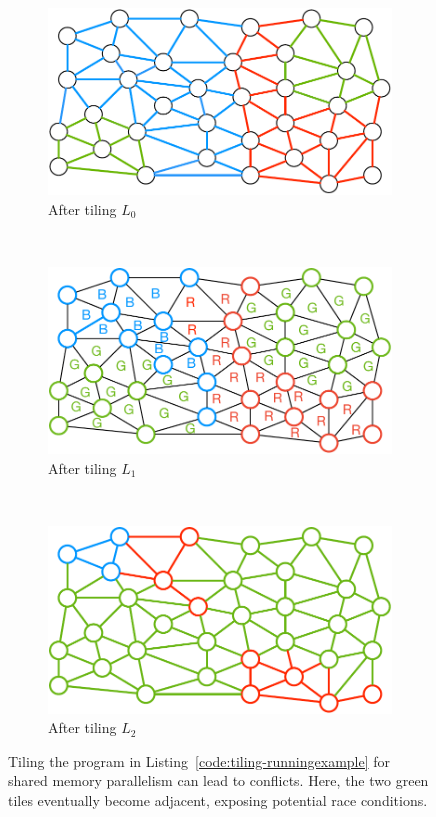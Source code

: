\begin{figure}[h]
\centering
\begin{subfigure}[b]{0.33\textwidth}
\includegraphics[width=\textwidth]{sparsetiling/figures/loop_0_conflicts.pdf}
\caption{After tiling $L_0$}
\label{fig:st-conflicts-a}
\end{subfigure}%
~ 
\begin{subfigure}[b]{0.33\textwidth}
\centering
\includegraphics[width=\textwidth]{sparsetiling/figures/loop_1_conflicts.pdf}
\caption{After tiling $L_1$}
\label{fig:st-conflicts-b}
\end{subfigure}%
~
\begin{subfigure}[b]{0.34\textwidth}
\centering
\includegraphics[width=\textwidth]{sparsetiling/figures/loop_2_conflicts.pdf}
\caption{After tiling $L_2$}
\label{fig:st-conflicts-c}
\end{subfigure}%

\caption{Tiling the program in Listing~\ref{code:tiling-runningexample} for shared memory parallelism can lead to conflicts. Here, the two green tiles eventually become adjacent, exposing potential race conditions.}
\label{fig:st-conflicts}
\end{figure}

